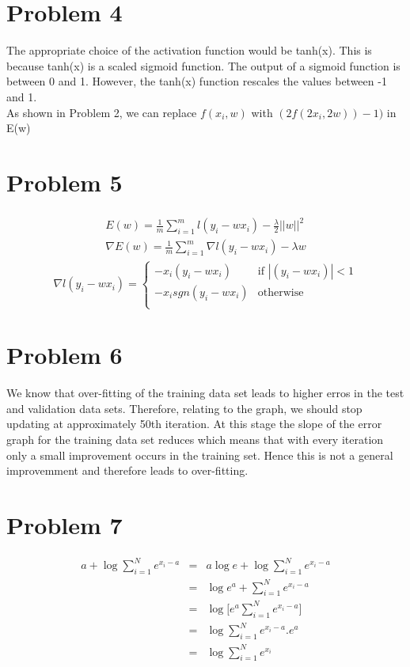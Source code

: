 \documentclass[10pt, a4paper, fleqn]{article}
\begin{document}
\section{Problem 4}
The appropriate choice of the activation function would be tanh(x). This is because tanh(x) is a scaled sigmoid function. The output of a sigmoid function is between 0 and 1. However, the tanh(x) function rescales the values between -1 and 1.\\
As shown in Problem 2, we can replace $f(x_i,w)$ with $(2f(2x_i,2w)) -1)$ in E(w)
\section{Problem 5}
\begin{eqnarray*}
\begin{aligned}
E(w) = \frac{1}{m} \sum\limits_{i=1}^{m}{l(y_i - wx_i)} - \frac{\lambda}{2}||w||^2\\
\nabla E(w) = \frac{1}{m} \sum\limits_{i=1}^{m}{\nabla l(y_i - wx_i)} - \lambda w
\end{aligned}
\end{eqnarray*}
\[
\nabla l(y_i - wx_i) = 
\begin{cases}
-x_i(y_i - wx_i) & \text{if $|(y_i - wx_i)| < 1$}\\
-x_i sgn(y_i - wx_i) & \text{otherwise}\\
\end{cases}\]
\section{Problem 6}
We know that over-fitting of the training data set leads to higher erros in the test and validation data sets. Therefore, relating to the graph, we should stop updating at approximately 50th iteration. At this stage the slope of the error graph for the training data set reduces which means that with every iteration only a small improvement occurs in the training set. Hence this is not a general improvemment and therefore leads to over-fitting.
\section{Problem 7}
\begin{eqnarray*}
a + \log \sum\limits_{i=1}^{N}{e^\text{$x_i -a$}}&=& a\log{e} + \log \sum\limits_{i=1}^{N}{e^\text{$x_i -a$}}\\
&=& \log{e^a} + \sum\limits_{i=1}^{N}{e^\text{$x_i -a$}}\\
&=& \log\Big[{e^a \sum\limits_{i=1}^{N}{e^\text{$x_i -a$}}}\Big]\\
&=& \log \sum\limits_{i=1}^{N}{e^\text{$x_i -a$}. e^a}\\
&=& \log \sum\limits_{i=1}^{N}{e^\text{$x_i$}}
\end{eqnarray*}
\end{document}
